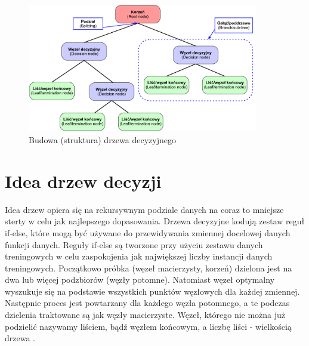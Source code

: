 \documentclass[10pt,a4paper]{article}
\begin{document}
\begin{figure}[ht]
	\centering
	\includegraphics[width=0.9\textwidth]{structure}
	\caption{Budowa (struktura) drzewa decyzyjnego}
	\label{fig:structure}
\end{figure}


\section{Idea drzew decyzji}
Idea drzew opiera się na rekursywnym podziale danych na coraz to mniejsze sterty w celu jak najlepszego dopasowania. Drzewa decyzyjne kodują zestaw reguł if-else, które mogą być używane do przewidywania zmiennej docelowej danych funkcji danych. Reguły if-else są tworzone przy użyciu zestawu danych treningowych w celu zaspokojenia jak największej liczby instancji danych treningowych. Początkowo próbka (węzeł macierzysty, korzeń) dzielona jest na dwa lub więcej podzbiorów (węzły potomne). Natomiast węzeł optymalny wyszukuje się na podstawie wszystkich punktów węzłowych dla każdej zmiennej. Następnie proces jest powtarzany dla każdego węzła potomnego, a te podczas dzielenia traktowane są jak węzły macierzyste. Węzeł, którego nie można już podzielić nazywamy liściem, bądź węzłem końcowym, a liczbę liści - wielkością drzewa \cite{MazumdarWWW, Quinlan1986, Breiman1984, Gatnar1998, Lula2007}.
\end{document}
